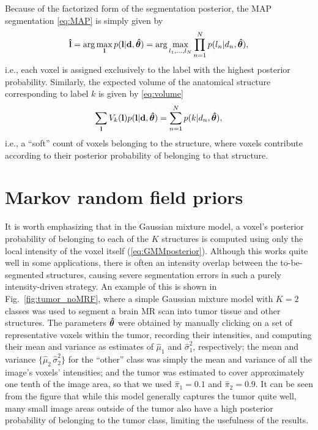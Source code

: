 \documentclass[10pt,twoside]{book}
\begin{document}
Because of the factorized form of the segmentation posterior, the MAP segmentation \eqref{eq:MAP} is simply given by 
\begin{equation}
  \mathbf{\hat{l}} = \arg\max_{\mathbf{l}} p( \mathbf{l} | \mathbf{d}, {\mbox{\boldmath {${\hat{\theta}}$}}}) = \arg \max_{l_1, \ldots, l_N} \prod_{n=1}^N p( l_n | d_n, {\mbox{\boldmath {${\hat{\theta}}$}}} ),
\end{equation}
i.e., each voxel is assigned exclusively to the label with the highest posterior probability. Similarly, the expected volume of the anatomical structure corresponding to label $k$ is given by \eqref{eq:volume}
\begin{equation}
 \sum_{\mathbf{l}} V_k( \mathbf{l} )  p( \mathbf{l} | \mathbf{d}, {\mbox{\boldmath {${\hat{\theta}}$}}} ) = \sum_{n=1}^N p( k | d_n, {\mbox{\boldmath {${\hat{\theta}}$}}} ),
\end{equation}
i.e., a ``soft'' count of voxels belonging to the structure, where voxels contribute according to their posterior probability of belonging to that structure.


\section{Markov random field priors}

It is worth emphasizing that in the Gaussian mixture model, a voxel's posterior probability of belonging to each of the $K$ structures is computed using only the local intensity of the voxel itself (\eqref{eq:GMMposterior}). Although this works quite well in some applications, there is often an intensity overlap between the to-be-segmented structures, causing severe segmentation errors in such a purely intensity-driven strategy. An example of this is shown in Fig.~\ref{fig:tumor_noMRF}, where a simple Gaussian mixture model with $K=2$ classes was used to segment a brain MR scan into tumor tissue and other structures. The parameters ${\mbox{\boldmath {${\hat{\theta}}$}}}$ were obtained by manually clicking on a set of representative voxels within the tumor, recording their intensities, and computing their mean and variance as estimates of $\hat{\mu}_1$ and $\hat{\sigma}_1^2$, respectively; the mean and variance $\{\hat{\mu}_2\, \hat{\sigma}_2^2\}$ for the ``other'' class was simply the mean and variance of all the image's voxels' intensities; and the tumor was estimated to cover approximately one tenth of the image area, so that we used $\hat{\pi}_1 = 0.1$ and $\hat{\pi}_2 = 0.9$. It can be seen from the figure that while this model generally captures the tumor quite well, many small image areas outside of the tumor also have a high posterior probability of belonging to the tumor class, limiting the usefulness of the results.
\end{document}
